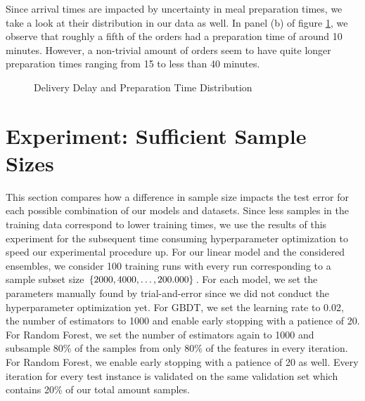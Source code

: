 Since arrival times are impacted by uncertainty in meal preparation times, we take a look at their distribution in our data as well. In panel (b) of figure \ref{fig:prepdelay}, we observe that roughly a fifth of the orders had a preparation time of around 10 minutes. However, a non-trivial amount of orders seem to have quite longer preparation times ranging from 15 to less than 40 minutes. 
\begin{figure}[h]
	\centering
	\caption{Delivery Delay and Preparation Time Distribution}
	\label{fig:prepdelay}
\end{figure}

\section{Experiment: Sufficient Sample Sizes}\label{sec:samplesize}

This section compares how a difference in sample size impacts the test error for each possible combination of our models and datasets. Since less samples in the training data correspond to lower training times, we use the results of this experiment for the subsequent time consuming hyperparameter optimization to speed our experimental procedure up. For our linear model and the considered ensembles, we consider 100 training runs with every run corresponding to a sample subset size $ \{2000, 4000, \dots,\\ 200.000\} $. For each model, we set the parameters manually found by trial-and-error since we did not conduct the hyperparameter optimization yet. For GBDT, we set the learning rate to 0.02, the number of estimators to 1000 and enable early stopping with a patience of 20. For Random Forest, we set the number of estimators again to 1000 and subsample 80\% of the samples from only 80\% of the features in every iteration. For Random Forest, we enable early stopping with a patience of 20 as well. Every iteration for every test instance is validated on the same validation set which contains 20\% of our total amount samples. 

